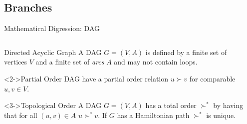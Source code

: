 \documentclass[xetex]{beamer}
\begin{document}
\subsection{Branches}

\begin{frame}[fragile]{Mathematical Digression: DAG}
  \begin{columns}
    \begin{column}{.55\linewidth}
      \begin{block}{Directed Acyclic Graph}
        A DAG $G = (V,A)$ is defined by a finite set of vertices $V$ and a
        finite set of \emph{arcs} $A$ and may not contain loops.
      \end{block}

      \begin{block}<2->{Partial Order}
        DAG have a partial order relation $u \succ v$ for comparable $u,v \in V$.
      \end{block}

      \begin{alertblock}<3->{Topological Order}
        A DAG $G = (V,A)$ has a total order $\succ^*$ by having that for all
        $(u, v) \in A$ $u \succ^* v$. If $G$ has a Hamiltonian path
        $\succ^*$
        is unique.
      \end{alertblock}
    \end{column}
    \begin{column}{.45\linewidth}
\end{column}
\end{columns}
\end{frame}
\end{document}
